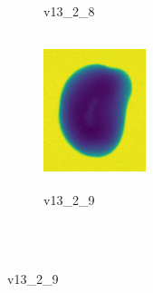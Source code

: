 \documentclass[11pt]{article}
\begin{document}
\begin{figure}
\begin{subfigure}[b]{0.15\textwidth}
        \caption{v13\_2\_8}
         \label{fig:five over x}
     \end{subfigure}
     \hfill
    \begin{subfigure}[b]{0.15\textwidth}
         \centering
         \includegraphics[width=3cm, height=4.5cm]{images/kartofler/v13_2_9_cut.png}
        \caption{v13\_2\_9}
         \label{fig:five over x}
     \end{subfigure} 
     
     
     \\ \\
     

\end{figure}
\end{document}
